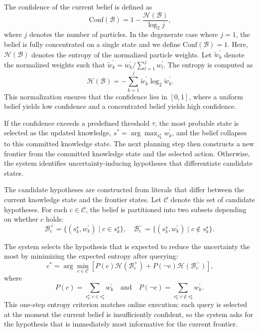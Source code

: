 The confidence of the current belief is defined as
\begin{equation}~\label{eq:compute_confidence}
\mathrm{Conf}(\mathcal{B}) = 1 - \frac{\mathcal{H}(\mathcal{B})}{\log_2 j},
\end{equation}
where $j$ denotes the number of particles. In the degenerate case where $j=1$, the belief is fully concentrated on a single state and we define $\mathrm{Conf}(\mathcal{B}) = 1$. Here, $\mathcal{H}(\mathcal{B})$ denotes the entropy of the normalized particle weights. Let $\tilde{w}_k^\prime$ denote the normalized weights such that $\tilde{w}_k^\prime = {w_k^\prime}/{\sum_{l=1}^{j} w_l^\prime}$. The entropy is computed as
\begin{equation}~\label{eq:compute_entropy}
\mathcal{H}(\mathcal{B}) = - \sum_{k=1}^{j} \tilde{w}_k^\prime \log_2 \tilde{w}_k^\prime.
\end{equation}
This normalization ensures that the confidence lies in $[0,1]$, where a uniform belief yields low confidence and a concentrated belief yields high confidence.

If the confidence exceeds a predefined threshold $\tau$, the most probable state is selected as the updated knowledge, $s^{*} = \arg\max_{s_k^{\star}} w_k^\prime$, and the belief collapses to this committed knowledge state. The next planning step then constructs a new frontier from the committed knowledge state and the selected action. Otherwise, the system identifies uncertainty-inducing hypotheses that differentiate candidate states.

The candidate hypotheses are constructed from literals that differ between the current knowledge state and the frontier states. Let $\mathcal{C}$ denote this set of candidate hypotheses. For each $c \in \mathcal{C}$, the belief is partitioned into two subsets depending on whether $c$ holds:
$$
\mathcal{B}^{+}_{c} = \{(s_k^{\star}, w_k^\prime) \mid c \in s_k^{\star}\},
\quad
\mathcal{B}^{-}_{c} = \{(s_k^{\star}, w_k^\prime) \mid c \notin s_k^{\star}\}.
$$


The system selects the hypothesis that is expected to reduce the uncertainty the most by minimizing the expected entropy after querying:
\begin{equation}~\label{eq:select_hypo}
c^{*} = \arg\min_{c \in \mathcal{C}}
\left[
P(c)\mathcal{H}(\mathcal{B}^{+}_{c}) +
P(\neg c)\mathcal{H}(\mathcal{B}^{-}_{c})
\right],
\end{equation}
where 
\[P(c)=\sum_{s_k^{\star}: c \in s_k^{\star}} w_k^\prime \quad \text{and} \quad P(\neg c)=\sum_{s_k^{\star}: c \notin s_k^{\star}} w_k^\prime.\]
This one-step entropy criterion matches online execution: each query is selected at the moment the current belief is insufficiently confident, so the system asks for the hypothesis that is immediately most informative for the current frontier.

